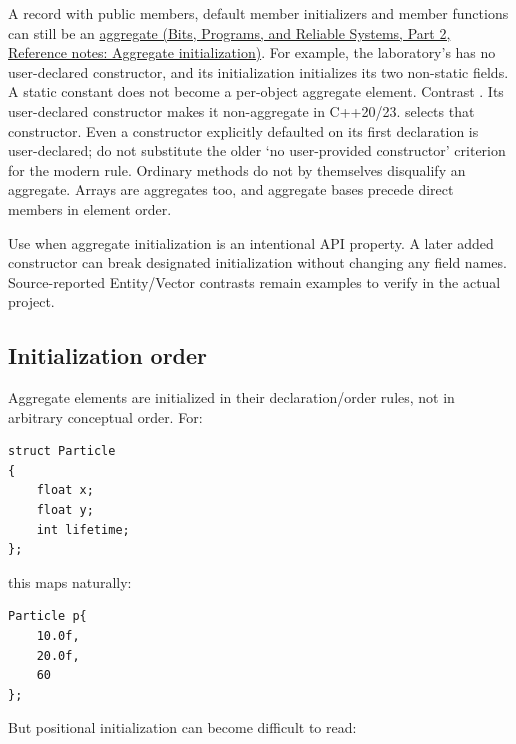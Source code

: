 A record with public members, default member initializers and member functions can still be an \href{../01-Bits-Programs-and-Reliable-Systems-P02/main.pdf\#nameddest=appendix-b7174c179542}{aggregate (Bits, Programs, and Reliable Systems, Part 2, Reference notes: Aggregate initialization)}. For example, the laboratory's  has no user-declared constructor, and its  initialization initializes its two non-static fields. A static constant does not become a per-object aggregate element. Contrast . Its user-declared constructor makes it non-aggregate in C++20/23.  selects that constructor. Even a constructor explicitly defaulted on its first declaration is user-declared; do not substitute the older `no user-provided constructor' criterion for the modern rule. Ordinary methods do not by themselves disqualify an aggregate. Arrays are aggregates too, and aggregate bases precede direct members in element order.

Use  when aggregate initialization is an intentional API property. A later added constructor can break designated initialization without changing any field names. Source-reported Entity/Vector contrasts remain examples to verify in the actual project.

\subsection{Initialization order}\label{05-engine-i-ch003-initialization-order}

\hypertarget{05-engine-i-ch003-initialization-order}{}

Aggregate elements are initialized in their declaration/order rules, not in arbitrary conceptual order. For:

\begin{verbatim}
struct Particle
{
    float x;
    float y;
    int lifetime;
};
\end{verbatim}

this maps naturally:

\begin{verbatim}
Particle p{
    10.0f,
    20.0f,
    60
};
\end{verbatim}

But positional initialization can become difficult to read:

